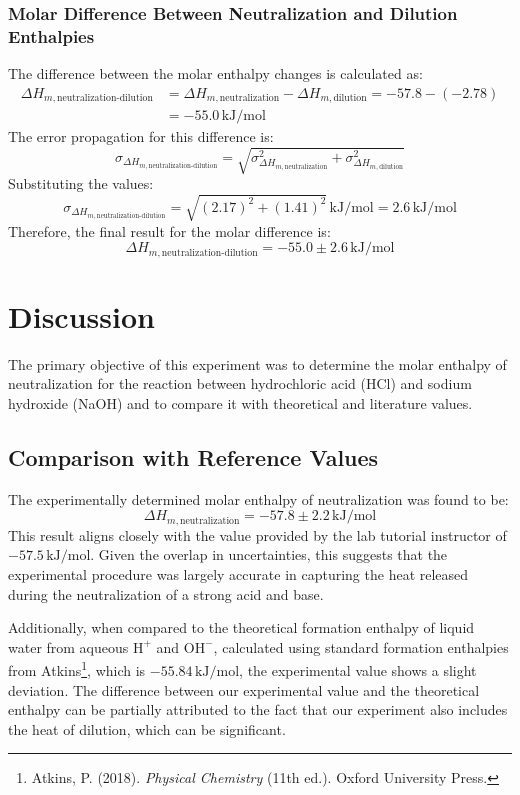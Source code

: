 \documentclass[a4paper,12pt]{article}
\begin{document}
\subsubsection{Molar Difference Between Neutralization and Dilution Enthalpies}
The difference between the molar enthalpy changes is calculated as:
\begin{align*}
\Delta H_{m, \text{neutralization-dilution}} &= \Delta H_{m, \text{neutralization}} - \Delta H_{m, \text{dilution}} = -57.8 - (-2.78) \\ &= -55.0 \, \si{\kilo\joule\per\mol}
\end{align*}
The error propagation for this difference is:
\[
\sigma_{\Delta H_{m, \text{neutralization-dilution}}} = \sqrt{\sigma_{\Delta H_{m, \text{neutralization}}}^2 + \sigma_{\Delta H_{m, \text{dilution}}}^2}
\]
Substituting the values:
\[
\sigma_{\Delta H_{m, \text{neutralization-dilution}}} = \sqrt{(2.17)^2 + (1.41)^2} \,\si{\kilo\joule\per\mol}= 2.6 \, \si{\kilo\joule\per\mol}
\]
Therefore, the final result for the molar difference is:
\[
\Delta H_{m, \text{neutralization-dilution}} = -55.0 \pm 2.6 \, \si{\kilo\joule\per\mol}
\]


\section{Discussion}
The primary objective of this experiment was to determine the molar enthalpy of neutralization for the reaction between hydrochloric acid (HCl) and sodium hydroxide (NaOH) and to compare it with theoretical and literature values. 

\subsection{Comparison with Reference Values}
The experimentally determined molar enthalpy of neutralization was found to be:
\[
\Delta H_{m, \text{neutralization}} = -57.8 \pm 2.2 \, \si{\kilo\joule\per\mol}
\]
This result aligns closely with the value provided by the lab tutorial instructor of \(-57.5 \, \si{\kilo\joule\per\mol}\). Given the overlap in uncertainties, this suggests that the experimental procedure was largely accurate in capturing the heat released during the neutralization of a strong acid and base.

Additionally, when compared to the theoretical formation enthalpy of liquid water from aqueous \(\text{H}^+\) and \(\text{OH}^-\), calculated using standard formation enthalpies from Atkins\footnote{Atkins, P. (2018). \textit{Physical Chemistry} (11th ed.). Oxford University Press.}, which is \(-55.84 \, \si{\kilo\joule\per\mol}\), the experimental value shows a slight deviation. The difference between our experimental value and the theoretical enthalpy can be partially attributed to the fact that our experiment also includes the heat of dilution, which can be significant.
\end{document}
